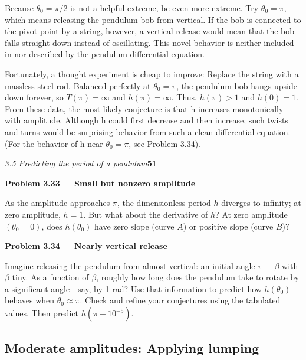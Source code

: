 \documentclass[a4paper, 11pt]{book}
\begin{document}
Because $ \theta _{0}= \pi/2$ is not a helpful extreme, be even more extreme. Try $ \theta _{0}= \pi$, which means releasing the pendulum bob from vertical. If the
bob is connected to the pivot point by a string, however, a vertical release
would mean that the bob falls straight down instead of oscillating. This
novel behavior is neither included in nor described by the pendulum
differential equation.
\vspace{6pt}

Fortunately, a thought experiment is cheap to improve:
Replace the string with a massless steel
rod. Balanced perfectly at $ \theta _{0}= \pi$, the pendulum
bob hangs upside down forever, so $T(\pi) = ∞$ and
$h(\pi) = ∞$. Thus, $h(\pi) > 1$ and $h(0) = 1$. From
these data, the most likely conjecture is that h increases
monotonically with amplitude. Although
h could first decrease and then increase, such twists and turns would
be surprising behavior from such a clean differential equation. (For the
behavior of h near $ \theta _{0}= \pi$, see Problem 3.34).

\newpage
\large\textit{3.5 Predicting the period of a pendulum}\hfill \textbf{51} \\
\vspace{15pt}

\colorbox{light-gray}{
\begin{minipage}{\textwidth}

\textbf{Problem 3.33~~~Small but nonzero amplitude}


As the amplitude approaches $\pi$, the dimensionless period $h$
diverges to infinity; at zero amplitude, $h = 1$. But what about
the derivative of $h$? At zero amplitude $(\theta_{0} = 0)$, does $h(\theta_{0})$
have zero slope (curve $A$) or positive slope (curve $B$)?
\vspace{20pt}

\textbf{Problem 3.34~~~Nearly vertical release}

Imagine releasing the pendulum from almost vertical:
an initial angle $\pi$ − $\beta$ with $\beta$ tiny. As a function of $\beta$,
roughly how long does the pendulum take to rotate by
a significant angle—say, by 1 rad? Use that information
to predict how $h(\theta_{0})$ behaves when $\theta_{0}
≈ \pi$. Check and
refine your conjectures using the tabulated values. Then
predict $h(\pi−10^{−5})$.
\end{minipage} }

\subsection{Moderate amplitudes: Applying lumping}
\end{document}
